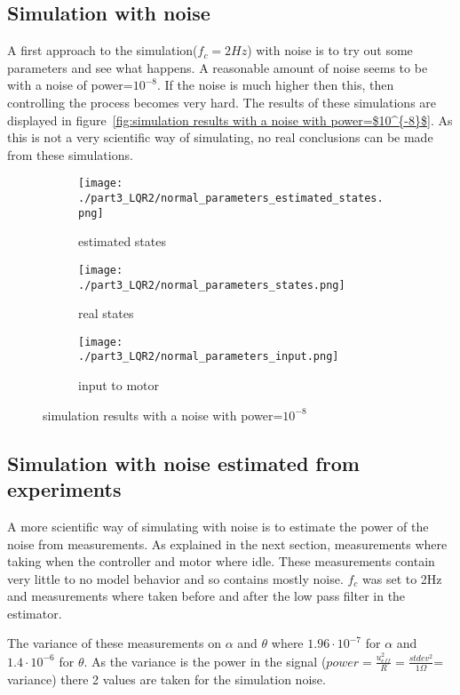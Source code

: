 \subsection{Simulation with noise}
	A first approach to the simulation($f_c=2Hz$) with noise is to try out some parameters and see what happens. A reasonable amount of noise seems to be with a noise of power=$10^{-8}$. If the noise is much higher then this, then controlling the process becomes very hard. The results of these simulations are displayed in figure~\ref{fig:simulation results with a noise with power=$10^{-8}$}. As this is not a very scientific way of simulating, no real conclusions can be made from these simulations.
	\begin{figure}[H]
		\centering
		\begin{subfigure}[b]{0.45\textwidth}
			\texttt{[image: ./part3\_LQR2/normal\_parameters\_estimated\_states.png]}
			\caption{estimated states}
		\end{subfigure}
		\begin{subfigure}[b]{0.45\textwidth}
			\texttt{[image: ./part3\_LQR2/normal\_parameters\_states.png]}
			\caption{real states}
		\end{subfigure}
		\begin{subfigure}[b]{0.45\textwidth}
			\texttt{[image: ./part3\_LQR2/normal\_parameters\_input.png]}
			\caption{input to motor}
		\end{subfigure}
		\caption{simulation results with a noise with power=$10^{-8}$}
		\label{fig:simulation results noise}
	\end{figure}
\subsection{Simulation with noise estimated from experiments}
	A more scientific way of simulating with noise is to estimate the power of the noise from measurements. As explained in the next section, measurements where taking when the controller and motor where idle. These measurements contain very little to no model behavior and so contains mostly noise. $f_c$ was set to 2Hz and measurements where taken before and after the low pass filter in the estimator. 
	
	The variance of these measurements on $\alpha$ and $\theta$ where $1.96 \cdot 10^{-7}$ for $\alpha$ and $1.4 \cdot 10^{-6}$ for $\theta$. As the variance is the power in the signal ($power = \frac{u_{eff}^2}{R} = \frac{stdev^2}{1 \Omega}$= variance) there 2 values are taken for the simulation noise.
	
